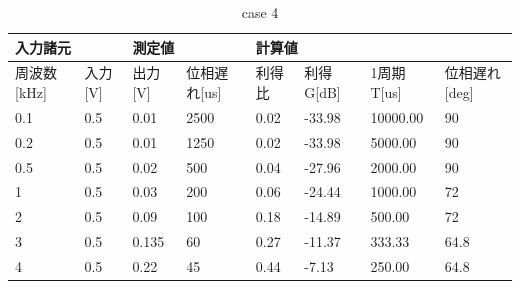\documentclass[dvipdfmx,titlepage,a4j]{jsarticle}  %
\begin{document}
\begin{table}[H]
  \centering
  \caption{case 4}
  \begin{tabular}{ll|ll|llll}
  \hline
  \multicolumn{2}{l|}{入力諸元}                        & \multicolumn{2}{l|}{測定値}                           & \multicolumn{4}{l}{計算値}                                                                                                                          \\ \hline
  \multicolumn{1}{l|}{周波数{[}kHz{]}} & 入力{[}V{]} & \multicolumn{1}{l|}{出力{[}V{]}} & 位相遅れ{[}us{]} & \multicolumn{1}{l|}{利得比} & \multicolumn{1}{l|}{利得G{[}dB{]}} & \multicolumn{1}{l|}{1周期T{[}us{]}} & \multicolumn{1}{l}{位相遅れ{[}deg{]}} \\ \hline \hline
  \multicolumn{1}{l|}{0.1}           & 0.5         & \multicolumn{1}{l|}{0.01}        & 2500            & \multicolumn{1}{l|}{0.02}    & \multicolumn{1}{l|}{-33.98}          & \multicolumn{1}{l|}{10000.00}        & 90                                  \\ \hline
  \multicolumn{1}{l|}{0.2}           & 0.5         & \multicolumn{1}{l|}{0.01}        & 1250            & \multicolumn{1}{l|}{0.02}    & \multicolumn{1}{l|}{-33.98}          & \multicolumn{1}{l|}{5000.00}         & 90                                  \\ \hline
  \multicolumn{1}{l|}{0.5}           & 0.5         & \multicolumn{1}{l|}{0.02}        & 500             & \multicolumn{1}{l|}{0.04}    & \multicolumn{1}{l|}{-27.96}          & \multicolumn{1}{l|}{2000.00}         & 90                                  \\ \hline
  \multicolumn{1}{l|}{1}             & 0.5         & \multicolumn{1}{l|}{0.03}        & 200             & \multicolumn{1}{l|}{0.06}    & \multicolumn{1}{l|}{-24.44}          & \multicolumn{1}{l|}{1000.00}         & 72                                  \\ \hline
  \multicolumn{1}{l|}{2}             & 0.5         & \multicolumn{1}{l|}{0.09}        & 100             & \multicolumn{1}{l|}{0.18}    & \multicolumn{1}{l|}{-14.89}          & \multicolumn{1}{l|}{500.00}          & 72                                  \\ \hline
  \multicolumn{1}{l|}{3}             & 0.5         & \multicolumn{1}{l|}{0.135}       & 60              & \multicolumn{1}{l|}{0.27}    & \multicolumn{1}{l|}{-11.37}          & \multicolumn{1}{l|}{333.33}          & 64.8                                \\ \hline
  \multicolumn{1}{l|}{4}             & 0.5         & \multicolumn{1}{l|}{0.22}        & 45              & \multicolumn{1}{l|}{0.44}    & \multicolumn{1}{l|}{-7.13}           & \multicolumn{1}{l|}{250.00}          & 64.8                                \\ \hline

\end{tabular}
\end{table}
\end{document}
